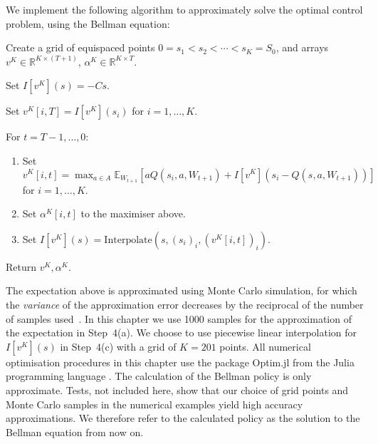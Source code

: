 \documentclass[main.tex]{subfiles}
\begin{document}
We implement the following algorithm to approximately solve the optimal control
problem, using the Bellman equation:
\begin{enumerate}
  \begin{samepage}
  \item Create a grid of equispaced points $0=s_1<s_2<\cdots<s_K=S_0$, and arrays $v^K\in\mathbb{R}^{K\times(T+1)}$,
    $\alpha^K\in\mathbb{R}^{K\times T}$.
  \item Set $I[v^K](s)=-Cs$.
  \item Set $v^K[i,T]=I[v^K](s_i)$ for $i=1,\dots, K$.
  \item For $t = T-1,\dots,0$:
    \begin{enumerate}
    \item Set $\displaystyle v^K[i,t]=\max_{a\in A}\mathbb{E}_{W_{t+1}}\left[ aQ(s_i,a,W_{t+1})
        +I[v^K](s_i-Q(s,a,W_{t+1}))\right]$\\ for $i=1,\dots,K$.
    \item Set $\alpha^K[i,t]$ to the maximiser above.
    \item Set $I[v^K](s) = \mathrm{Interpolate}(s, {(s_i)}_i,{(v^K[i,t])}_i)$.
    \end{enumerate}
  \item Return $v^K,\alpha^K$.
  \end{samepage}
\end{enumerate}
The expectation above is approximated using Monte Carlo simulation,
for which the \emph{variance} of the approximation error decreases by the
reciprocal of the
number of samples used~\citep{caflisch1998monte}.
In this chapter we use \num{1000} samples for the approximation of the
expectation in Step~4(a).
We choose to use piecewise
linear interpolation for $I[v^K](s)$ in Step~4(c) with a grid of
$K=201$ points. All numerical optimisation procedures in this chapter
use the package Optim.jl \citep{mogensen2018optim} from the Julia
programming language \citep{bezanson2017julia}.
The calculation of the Bellman policy is only
approximate. Tests, not included here, show that our choice of grid points and Monte Carlo samples
in the numerical examples yield high accuracy approximations.
We therefore refer to the calculated policy as the solution to the
Bellman equation from now on.
\end{document}

